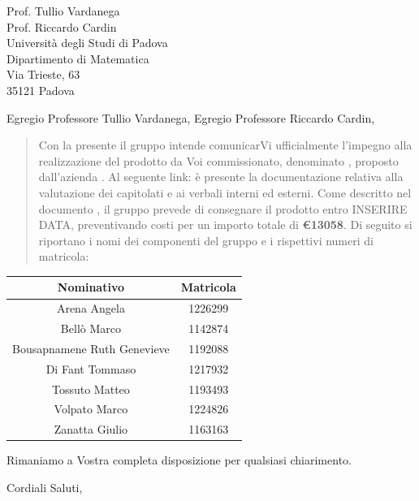 \documentclass{letteracdp}
\date{8 aprile 2022}
\begin{document}
	\begin{letter}{
			Prof. Tullio Vardanega \\
			Prof. Riccardo Cardin \\
			Università degli Studi di Padova \\
			Dipartimento di Matematica \\
			Via Trieste, 63 \\
			35121 Padova}
		
		\opening{Egregio Professore Tullio Vardanega, \newline Egregio Professore Riccardo Cardin,}
		
		\begin{quotation}
			\noindent 
			Con la presente il gruppo \teamname{} intende comunicarVi ufficialmente l'impegno alla realizzazione del prodotto da Voi commissionato, denominato \progetto{}, proposto dall’azienda \proponente.\newline
			Al seguente link: \href{\github}{\textit{\github}} è presente la documentazione relativa alla valutazione dei capitolati e ai verbali interni ed esterni. \newline
			Come descritto nel documento \textit{\preventivo}, il gruppo \textit{\teamname} prevede di consegnare il prodotto entro INSERIRE DATA, preventivando costi per un importo totale di \textbf{\euro{13058}}. \newline
			Di seguito si riportano i nomi dei componenti del gruppo e i rispettivi numeri di matricola:
		\end{quotation}
	
		\def\arraystretch{1}
	\begin{table}
	\begin{center}
		\setlength{\extrarowheight}{.75ex}
		\begin{tabular}{ c | c }
			\textbf{Nominativo} & \textbf{Matricola}\\
			\hline 			
			
			Arena Angela{} & 1226299{} \\
			Bellò Marco{} & 1142874{} \\
			Bousapnamene Ruth Genevieve{} & 1192088{} \\
			Di Fant Tommaso{} & 1217932{} \\
			Tossuto Matteo{} & 1193493{} \\
			Volpato Marco{} & 1224826{} \\
			Zanatta Giulio{} & 1163163{} \\	
			
			\hline 
		\end{tabular}
	\end{center}
\end{table}

Rimaniamo a Vostra completa disposizione per qualsiasi chiarimento.

			\vspace{0.5cm}
			\closing{ Cordiali Saluti,}
		
	\end{letter}
\end{document}

